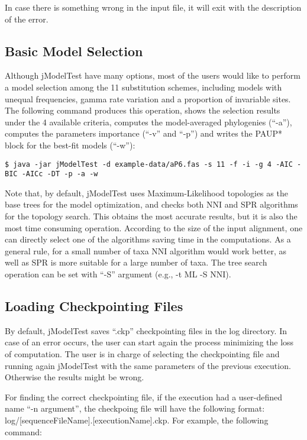 \documentclass[11pt,twoside,a4paper]{article}
\begin{document}
In case there is something wrong in the input file, it will exit with the description of the error.

\subsection{Basic Model Selection}

Although jModelTest have many options, most of the users would like to perform a model selection among the 11 substitution schemes, including models with unequal frequencies, gamma rate variation and a proportion of invariable sites. The following command produces this operation, shows the selection results under the 4 available criteria, computes the model-averaged phylogenies (``-a''), computes the parameters importance (``-v'' and ``-p'') and writes the PAUP* block for the best-fit models (``-w''):

\begin{lstlisting}
$ java -jar jModelTest -d example-data/aP6.fas -s 11 -f -i -g 4 -AIC -BIC -AICc -DT -p -a -w
\end{lstlisting}

Note that, by default, jModelTest uses Maximum-Likelihood topologies as the base trees for the model optimization, and checks both NNI and SPR algorithms for the topology search. This obtains the most accurate results, but it is also the most time consuming operation. According to the size of the input alignment, one can directly select one of the algorithms saving time in the computations. As a general rule, for a small number of taxa NNI algorithm would work better, as well as SPR is more suitable for a large number of taxa. The tree search operation can be set with ``-S'' argument (e.g., -t ML -S NNI).

\subsection{Loading Checkpointing Files}

By default, jModelTest saves ``.ckp'' checkpointing files in the log directory. In case of an error occurs, the user can start again the process minimizing the loss of computation. The user is in charge of selecting the checkpointing file and running again jModelTest with the same parameters of the previous execution. Otherwise the results might be wrong.

For finding the correct checkpointing file, if the execution had a user-defined name ``-n argument'', the checkpoing file will have the following format: log/[sequenceFileName].[executionName].ckp. For example, the following command:
\end{document}
